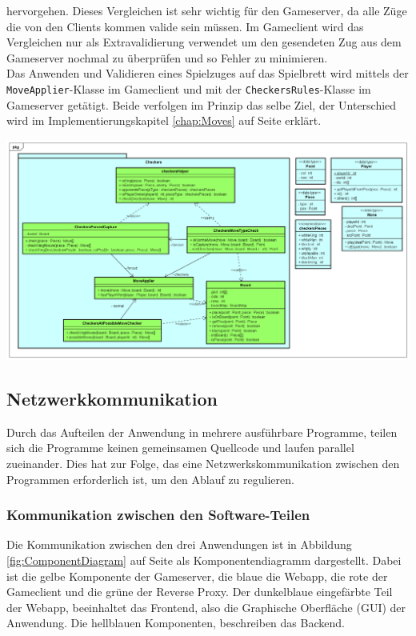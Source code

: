 \documentclass[12pt,a4paper,bibliography=totocnumbered,listof=totocnumbered]{article}
\begin{document}
hervorgehen. Dieses Vergleichen ist sehr wichtig für den Gameserver, da alle Züge die von den Clients kommen valide sein müssen. Im Gameclient wird das Vergleichen nur 
als Extravalidierung verwendet um den gesendeten Zug aus dem Gameserver nochmal zu überprüfen und so Fehler zu minimieren.
\\
Das Anwenden und Validieren eines Spielzuges auf das Spielbrett wird mittels der \texttt{MoveApplier}-Klasse im Gameclient und mit der \texttt{CheckersRules}-Klasse im Gameserver 
getätigt. Beide verfolgen im Prinzip das selbe Ziel, der Unterschied wird im Implementierungskapitel \ref{chap:Moves} auf Seite \pageref{chap:Moves} erklärt.

\vspace{1em}
\begin{minipage}{\linewidth}
	\centering
	\includegraphics[width=1.0\linewidth]{pics/GameLogic.png}
	\label{fig:GameLogic}
\end{minipage}





\subsection{Netzwerkkommunikation}
\label{chap:Networkcom}
Durch das Aufteilen der Anwendung in mehrere ausführbare Programme, teilen sich die Programme keinen gemeinsamen Quellcode und laufen parallel zueinander. 
Dies hat zur Folge, das eine Netzwerkskommunikation zwischen den Programmen erforderlich ist, um den Ablauf zu regulieren.

\subsubsection{Kommunikation zwischen den Software-Teilen}
Die Kommunikation zwischen den drei Anwendungen ist in Abbildung \ref{fig:ComponentDiagram} auf Seite \pageref{fig:ComponentDiagram} als 
Komponentendiagramm dargestellt. Dabei ist die gelbe Komponente der Gameserver, die blaue die Webapp, die rote der Gameclient und die grüne der Reverse Proxy.
Der dunkelblaue eingefärbte Teil der Webapp, beeinhaltet das Frontend, also die Graphische Oberfläche (GUI) der Anwendung.
Die hellblauen Komponenten, beschreiben das Backend. 
\end{document}
